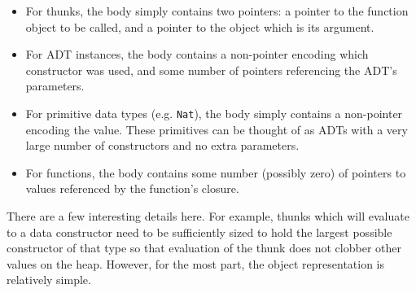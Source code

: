 \documentclass[9pt]{extarticle}
\begin{document}
\begin{itemize}
  \item For thunks, the body simply contains two pointers: a pointer to
    the function object to be called, and a pointer to the object which
    is its argument.

  \item For ADT instances, the body contains a non-pointer encoding
    which constructor was used, and some number of pointers referencing
    the ADT's parameters.

  \item For primitive data types (e.g. \verb'Nat'), the body simply
    contains a non-pointer encoding the value. These primitives can be
    thought of as ADTs with a very large number of constructors and no
    extra parameters.

  \item For functions, the body contains some number (possibly zero) of
    pointers to values referenced by the function's closure.
\end{itemize}

There are a few interesting details here. For example, thunks which will
evaluate to a data constructor need to be sufficiently sized to hold the
largest possible constructor of that type so that evaluation of the
thunk does not clobber other values on the heap. However, for the most
part, the object representation is relatively simple.
\end{document}
